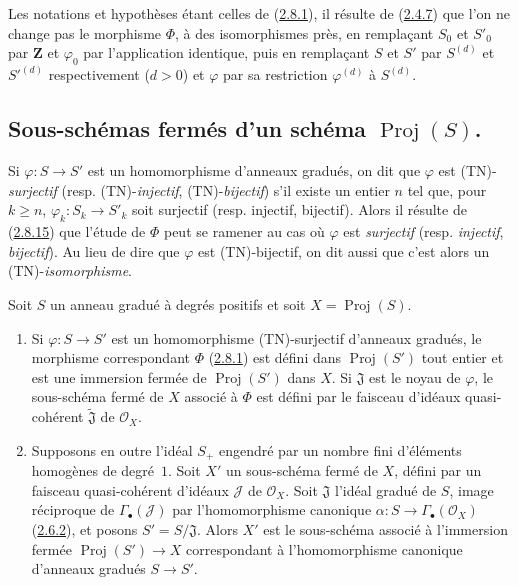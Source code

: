 
\begin{env}[2.8.15]
\label{II.2.8.15-fr}
Les notations et hypothèses étant celles de
(\hyperref[II.2.8.1-fr]{2.8.1}), il résulte de
(\hyperref[II.2.4.7-fr]{2.4.7}) que l'on ne change pas le morphisme $\Phi$,
à des isomorphismes près, en remplaçant $S_0$ et $S'_0$ par
$\mathbf{Z}$ et $\varphi_0$ par l'application identique, puis en remplaçant
$S$ et $S'$ par $S^{(d)}$ et ${S'}^{(d)}$ respectivement ($d>0$) et
$\varphi$ par sa restriction $\varphi^{(d)}$ à $S^{(d)}$.
\end{env}

\subsection{Sous-schémas fermés d'un schéma $\operatorname{Proj}(S)$.}
\label{subsection:II.2.9-fr}

\begin{env}[2.9.1]
\label{II.2.9.1-fr}
Si $\varphi:S\to S'$ est un homomorphisme d'anneaux gradués, on dit que
$\varphi$ est (TN)-\emph{surjectif} (resp. (TN)-\emph{injectif},
(TN)-\emph{bijectif}) s'il existe un entier $n$ tel que, pour $k\geq n$,
$\varphi_k:S_k\to S'_k$ soit surjectif (resp. injectif, bijectif). Alors il
résulte de (\hyperref[II.2.8.15-fr]{2.8.15}) que l'étude de $\Phi$ peut se
ramener au cas où $\varphi$ est \emph{surjectif} (resp. \emph{injectif},
\emph{bijectif}). Au lieu de dire que $\varphi$ est (TN)-bijectif, on dit aussi
que c'est alors un (TN)-\emph{isomorphisme}.
\end{env}

\begin{proposition}[2.9.2]
\label{II.2.9.2-fr}
Soit $S$ un anneau gradué à degrés positifs et soit
$X=\operatorname{Proj}(S)$.
\begin{enumerate}
  \item[\rm(i)] Si $\varphi:S\to S'$ est un homomorphisme (TN)-surjectif
    d'anneaux gradués, le morphisme correspondant $\Phi$
    (\hyperref[II.2.8.1-fr]{2.8.1}) est défini dans
    $\operatorname{Proj}(S')$ tout entier et est une immersion fermée de
    $\operatorname{Proj}(S')$ dans $X$. Si $\mathfrak{J}$ est le noyau de
    $\varphi$, le sous-schéma fermé de $X$ associé à $\Phi$ est défini par
    le faisceau d'idéaux quasi-cohérent $\widetilde{\mathfrak{J}}$ de
    $\mathcal{O}_X$.
  \item[\rm(ii)] Supposons en outre l'idéal $S_+$ engendré par un nombre
    fini d'éléments homogènes de degré~$1$. Soit $X'$ un sous-schéma fermé
    de $X$, défini par un faisceau quasi-cohérent d'idéaux $\mathcal{J}$ de
    $\mathcal{O}_X$. Soit $\mathfrak{J}$ l'idéal gradué de $S$, image
    réciproque de $\Gamma_\bullet(\mathcal{J})$ par l'homomorphisme canonique
    $\alpha:S\to\Gamma_\bullet(\mathcal{O}_X)$
    (\hyperref[II.2.6.2-fr]{2.6.2}), et posons
    $S'=S/\mathfrak{J}$. Alors $X'$ est le sous-schéma associé à
    l'immersion fermée $\operatorname{Proj}(S')\to X$ correspondant à
    l'homomorphisme canonique d'anneaux gradués $S\to S'$.
\end{enumerate}
\end{proposition}

